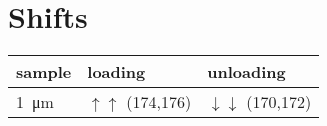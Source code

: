 \documentclass[a4paper]{report}
\begin{document}
%
%

\section{Shifts}
\begin{tabular}{lll}
 \toprule
 sample & loading & unloading \\
 \midrule
 \SI{1}{\micro\meter} & $\uparrow \uparrow$ (174,176) &
 $\downarrow \downarrow$ (170,172)\\
 \bottomrule
\end{tabular}
\end{document}
